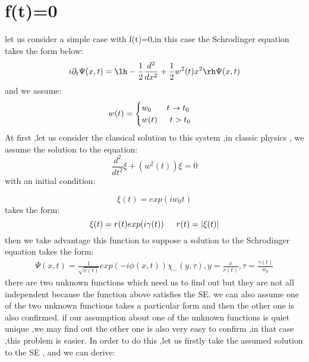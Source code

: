 \section{f(t)=0}
\begin{frame}
let us consider a simple case with f(t)=0,in this case the Schrodinger equation takes the form below:
\begin{align*}
i\partial_t \Psi(x,t)=\lh-\frac{1}{2}\frac{d^2}{dx^2}+\frac{1}{2}w^2(t)x^2\rh\Psi(x,t)
\end{align*}
and we assume:
\begin{align*}
w(t)=\begin{cases}
w_0\indent\ t\rightarrow t_0\\
w(t)\indent t>t_0             
\end{cases}
\end{align*}
At first ,let us consider  the classical solution to this system ,in classic physics , we assume the solution to the equation:
\[\frac{d^2}{dt^2}\xi+(w^2(t))\xi=0\]
with an initial condition:
\end{frame}
\begin{frame}
\[\xi(t)=exp(iw_0t)\]
takes the form:
\[\xi(t)=r(t)exp(i\gamma(t))\indent r(t)=|\xi(t)|\]
then we take advantage this function to suppose a solution to the Schrodinger equation takes the form:
\begin{align*}
\Psi(x,t)=\frac{1}{\sqrt{r(t)}}exp(-i\phi(x,t))\chi_- (y,\tau),y=\frac{x}{r(t)},\tau=\frac{\gamma(t)}{w_0}
\end{align*}
there are two unknown functions which need us to find out but they are not all independent because the function above satisfies the SE. we can also assume one of the two unknown functions takes a particular form and then the other one is also confirmed. if our assumption about one of the unknown functions is quiet unique ,we may find out the other one is also very easy to confirm ,in that case ,this problem is easier. In order to do this ,let us firstly take the assumed solution to the SE , and we can derive:
\end{frame}
